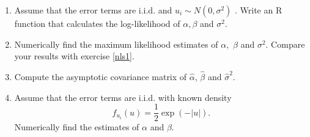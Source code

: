 \documentclass{article}
\begin{document}
\begin{enumerate}
\item Assume that the error terms are i.i.d. and $u_{i}\sim N(0,\sigma ^{2})$%
. Write an R function that calculates the log-likelihood of $\alpha ,\beta $
and $\sigma ^{2}$.

\item Numerically find the maximum likelihood estimates of $\alpha ,$ $\beta
$ and $\sigma ^{2}$. Compare your results with exercise \ref{nls1}.

\item Compute the asymptotic covariance matrix of $\hat{\alpha}$, $\hat{\beta%
}$ and $\hat{\sigma}^{2}$.

\item Assume that the error terms are i.i.d. with known density%
\begin{equation*}
f_{u_{i}}(u)=\frac{1}{2}\exp \left( -|u|\right) .
\end{equation*}%
Numerically find the estimates of $\alpha $ and $\beta $.
\end{enumerate}
\end{document}
